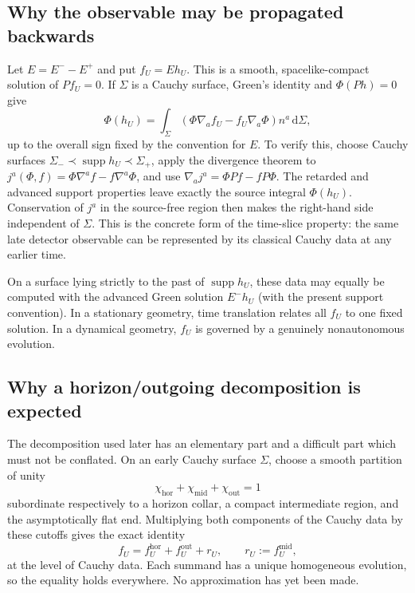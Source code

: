 \documentclass[11pt,a4paper]{article}
\theoremstyle{definition}
\theoremstyle{remark}
\newcommand{\dd}{\mathrm d}
\newcommand{\supp}{\operatorname{supp}}
\begin{document}
	\subsection{Why the observable may be propagated backwards}
	
	Let $E=E^--E^+$ and put $f_U=Eh_U$.  This is a smooth, spacelike-compact
	solution of $Pf_U=0$.  If $\Sigma$ is a Cauchy surface, Green's identity and
	$\Phi(Ph)=0$ give
	\begin{equation}
		\Phi(h_U)=\int_\Sigma
		\left(\Phi\nabla_af_U-f_U\nabla_a\Phi\right)n^a\,\dd\Sigma,
		\label{eq:detector-timeslice}
	\end{equation}
	up to the overall sign fixed by the convention for $E$.  To verify this,
	choose Cauchy surfaces $\Sigma_-\prec\supp h_U\prec\Sigma_+$, apply the
	divergence theorem to
	$j^a(\Phi,f)=\Phi\nabla^af-f\nabla^a\Phi$, and use
	$\nabla_aj^a=\Phi Pf-fP\Phi$.  The retarded and advanced support properties
	leave exactly the source integral $\Phi(h_U)$.  Conservation of $j^a$ in the
	source-free region then makes the right-hand side independent of $\Sigma$.
	This is the concrete form of the time-slice property: the same late detector
	observable can be represented by its classical Cauchy data at any earlier
	time.
	
	On a surface lying strictly to the past of $\supp h_U$, these data may equally
	be computed with the advanced Green solution $E^-h_U$ (with the present
	support convention).  In a stationary geometry, time translation relates all
	$f_U$ to one fixed solution.  In a dynamical geometry, $f_U$ is governed by a
	genuinely nonautonomous evolution.
	
	\subsection{Why a horizon/outgoing decomposition is expected}
	
	The decomposition used later has an elementary part and a difficult part
	which must not be conflated.  On an early Cauchy surface $\Sigma$, choose a
	smooth partition of unity
	\begin{equation}
		\chi_{\mathrm{hor}}+\chi_{\mathrm{mid}}+\chi_{\mathrm{out}}=1
		\label{eq:channel-partition}
	\end{equation}
	subordinate respectively to a horizon collar, a compact intermediate region,
	and the asymptotically flat end.  Multiplying both components of the Cauchy
	data by these cutoffs gives the exact identity
	\begin{equation}
		f_U=f_U^{\mathrm{hor}}+f_U^{\mathrm{out}}+r_U,
		\qquad r_U:=f_U^{\mathrm{mid}},
		\label{eq:dynamical-decomposition}
	\end{equation}
	at the level of Cauchy data.  Each summand has a unique homogeneous evolution,
	so the equality holds everywhere.  No approximation has yet been made.
	
\end{document}
